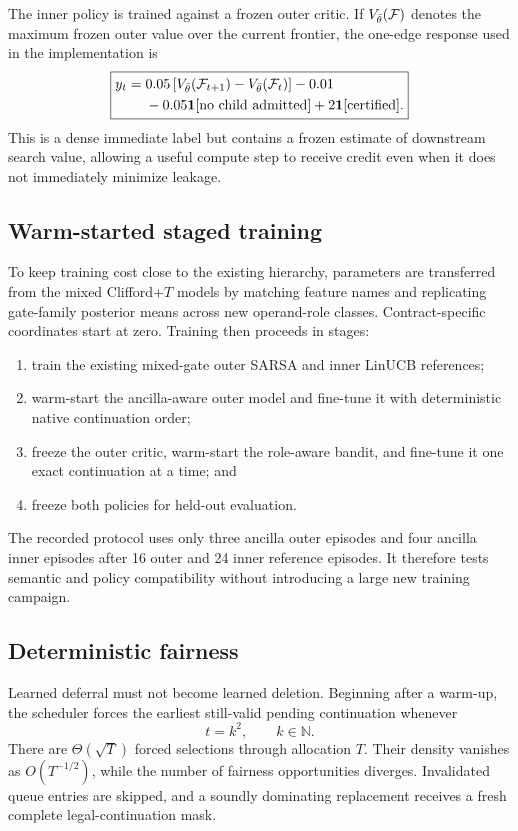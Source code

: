 The inner policy is trained against a frozen outer critic. If $V_{\bar\theta}(\mathcal{F})$ denotes the maximum frozen outer value over the current frontier, the one-edge response used in the implementation is
\begin{equation}
\boxed{
\begin{aligned}
y_t={}&0.05\left[V_{\bar\theta}(\mathcal{F}_{t+1})-V_{\bar\theta}(\mathcal{F}_t)\right]-0.01\\
&-0.05\mathbf{1}[\text{no child admitted}]
+2\mathbf{1}[\text{certified}].
\end{aligned}
}
\label{eq:bandit-response}
\end{equation}
This is a dense immediate label but contains a frozen estimate of downstream search value, allowing a useful compute step to receive credit even when it does not immediately minimize leakage.

\subsection{Warm-started staged training}

To keep training cost close to the existing hierarchy, parameters are transferred from the mixed Clifford+$T$ models by matching feature names and replicating gate-family posterior means across new operand-role classes. Contract-specific coordinates start at zero. Training then proceeds in stages:
\begin{enumerate}
\item train the existing mixed-gate outer SARSA and inner LinUCB references;
\item warm-start the ancilla-aware outer model and fine-tune it with deterministic native continuation order;
\item freeze the outer critic, warm-start the role-aware bandit, and fine-tune it one exact continuation at a time; and
\item freeze both policies for held-out evaluation.
\end{enumerate}
The recorded protocol uses only three ancilla outer episodes and four ancilla inner episodes after 16 outer and 24 inner reference episodes. It therefore tests semantic and policy compatibility without introducing a large new training campaign.

\subsection{Deterministic fairness}

Learned deferral must not become learned deletion. Beginning after a warm-up, the scheduler forces the earliest still-valid pending continuation whenever
\begin{equation}
t=k^2,
\qquad k\in\mathbb N.
\label{eq:square-fairness}
\end{equation}
There are $\Theta(\sqrt T)$ forced selections through allocation $T$. Their density vanishes as $O(T^{-1/2})$, while the number of fairness opportunities diverges. Invalidated queue entries are skipped, and a soundly dominating replacement receives a fresh complete legal-continuation mask.

